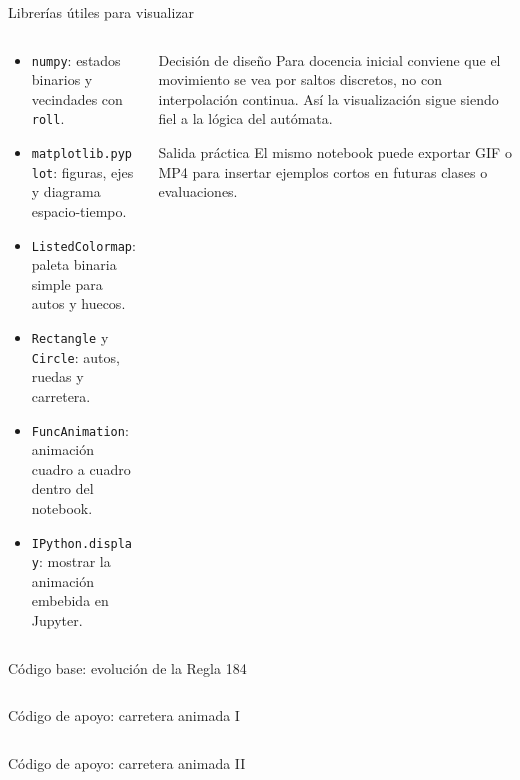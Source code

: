 \begin{frame}{Librerías útiles para visualizar}
\begin{columns}[T]
\begin{column}{0.52\textwidth}
\begin{itemize}
    \item \texttt{numpy}: estados binarios y vecindades con \texttt{roll}.
    \item \texttt{matplotlib.pyplot}: figuras, ejes y diagrama espacio-tiempo.
    \item \texttt{ListedColormap}: paleta binaria simple para autos y huecos.
    \item \texttt{Rectangle} y \texttt{Circle}: autos, ruedas y carretera.
    \item \texttt{FuncAnimation}: animación cuadro a cuadro dentro del notebook.
    \item \texttt{IPython.display}: mostrar la animación embebida en Jupyter.
\end{itemize}
\end{column}
\begin{column}{0.48\textwidth}
\begin{block}{Decisión de diseño}
Para docencia inicial conviene que el movimiento se vea por saltos discretos, no con interpolación continua. Así la visualización sigue siendo fiel a la lógica del autómata.
\end{block}

\begin{block}{Salida práctica}
El mismo notebook puede exportar GIF o MP4 para insertar ejemplos cortos en futuras clases o evaluaciones.
\end{block}
\end{column}
\end{columns}
\end{frame}

\begin{frame}[fragile]{Código base: evolución de la Regla 184}
\inputminted[fontsize=\tiny,baselinestretch=0.72,numbersep=2pt,firstline=1,lastline=37]{python}{codes/rule184_traffic.py}
\end{frame}

\begin{frame}[fragile]{Código de apoyo: carretera animada I}
\inputminted[fontsize=\tiny,baselinestretch=0.82,numbersep=2pt,firstline=40,lastline=59]{python}{codes/rule184_traffic.py}
\end{frame}

\begin{frame}[fragile]{Código de apoyo: carretera animada II}
\inputminted[fontsize=\tiny,baselinestretch=0.82,numbersep=2pt,firstline=60,lastline=78]{python}{codes/rule184_traffic.py}
\end{frame}

